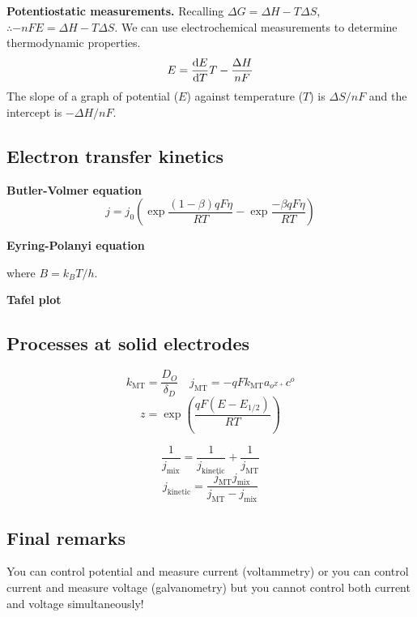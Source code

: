 \textbf{Potentiostatic measurements.} Recalling $\Delta G = \Delta H - T \Delta S$, 
$ \therefore - nFE = \Delta H - T \Delta S$. We can use electrochemical measurements to determine
thermodynamic properties.
\begin{equation*}
    E = \dv{E}{T}T - \frac{\Delta H}{nF}
\end{equation*} The slope of a graph of potential ($E$) against temperature ($T$)
is $\Delta S / nF$ and the intercept is $- \Delta H / nF$.

\subsection*{Electron transfer kinetics}

\textbf{Butler-Volmer equation}
\begin{equation*}
    j = j_0 \left( \exp \frac{(1 - \beta)qF\eta}{RT} - \exp \frac{-\beta q F \eta}{RT} \right)
\end{equation*}

\textbf{Eyring-Polanyi equation}

where $B = k_BT/h$.

\textbf{Tafel plot}

\subsection*{Processes at solid electrodes}
\begin{equation*}
    k_{\textrm{MT}} = \frac{D_O}{\delta_D} \quad j_{\textrm{MT}} = -qF k_{\textrm{MT}}a_{o^{Z+}}c^o
\end{equation*}
\begin{equation*}
    z = \exp \left( \frac{qF(E - E_{1/2})}{RT} \right)
\end{equation*}

\begin{equation*}
    \frac{1}{j_{\textrm{mix}}} = \frac{1}{j_{\textrm{kinetic}}} + \frac{1}{j_{\textrm{MT}}} 
\end{equation*}
\begin{equation*}
    j_{\textrm{kinetic}} = \frac{j_{\textrm{MT}}j_{\textrm{mix}}}{j_{\textrm{MT}} - j_{\textrm{mix}}}
\end{equation*}

\subsection*{Final remarks}
You can control potential and measure current (voltammetry) or you can control current
and measure voltage (galvanometry) but you cannot control both current and voltage
simultaneously!

